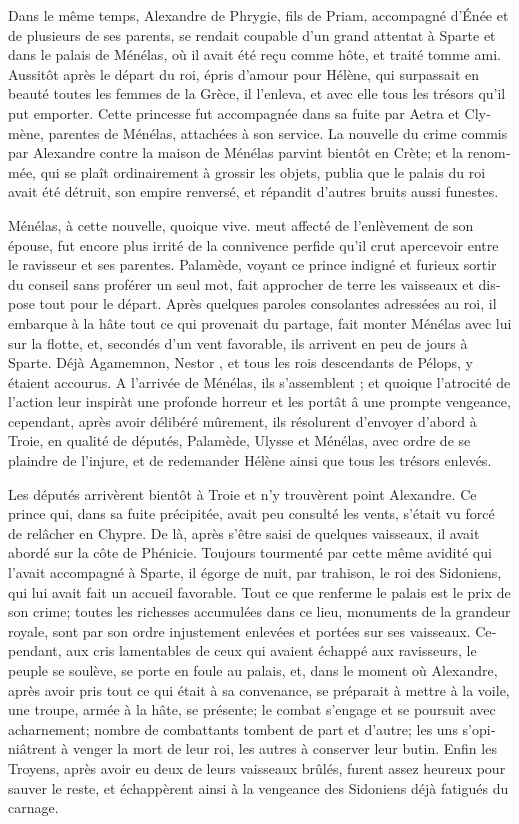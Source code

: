 \documentclass{article}
\begin{document}
\begin{pages}
\begin{Leftside}
\begin{french}
Dans le même temps, Alexandre de Phrygie, fils de Priam, accompagné d'Énée  et de plusieurs de ses parents, se rendait coupable d'un grand attentat à Sparte et dans le palais de Ménélas, où il avait été reçu comme hôte, et traité tomme ami. Aussitôt après le départ du roi, épris d'amour pour Hélène, qui surpassait en beauté toutes les femmes de la Grèce, il l'enleva, et avec elle tous les trésors qu'il put emporter. Cette princesse fut accompagnée dans sa fuite par Aetra et Clymène, parentes de Ménélas, attachées à son service. La nouvelle du crime commis par Alexandre contre la maison de Ménélas parvint bientôt en Crète; et la renommée, qui se plaît ordinairement à grossir les objets, publia que le palais du roi avait été détruit, son empire renversé, et répandit d'autres bruits aussi funestes.

Ménélas, à cette nouvelle, quoique vive. meut affecté de l'enlèvement de son épouse, fut encore plus irrité de la connivence perfide qu'il crut apercevoir entre le ravisseur et ses parentes. Palamède, voyant ce prince indigné et furieux sortir du conseil sans proférer un seul mot, fait approcher de terre les vaisseaux et dispose tout pour le départ. Après quelques paroles consolantes adressées au roi, il embarque à la hâte tout ce qui provenait du partage, fait monter Ménélas avec lui sur la flotte, et, secondés d'un vent favorable, ils arrivent en peu de jours à Sparte. Déjà Agamemnon, Nestor , et tous les rois descendants de Pélops, y étaient accourus. A l'arrivée de Ménélas, ils s'assemblent ; et quoique l'atrocité de l'action leur inspiràt une profonde horreur et les portât â une prompte vengeance, cependant, après avoir délibéré mûrement, ils résolurent d'envoyer d'abord à Troie, en qualité de députés, Palamède, Ulysse et Ménélas, avec ordre de se plaindre de l'injure, et de redemander Hélène ainsi que tous les trésors enlevés.

Les députés arrivèrent bientôt à Troie et n'y trouvèrent point Alexandre. Ce prince qui, dans sa fuite précipitée, avait peu consulté les vents, s'était vu forcé de relâcher en Chypre. De là, après s'être saisi de quelques vaisseaux, il avait abordé sur la côte de Phénicie. Toujours tourmenté par cette même avidité qui l'avait accompagné à Sparte, il égorge de nuit, par trahison, le roi des Sidoniens, qui lui avait fait un accueil favorable. Tout ce que renferme le palais est le prix de son crime; toutes les richesses accumulées dans ce lieu, monuments de la grandeur royale, sont par son ordre injustement enlevées et portées sur ses vaisseaux. Cependant, aux cris lamentables de ceux qui avaient échappé aux ravisseurs, le peuple se soulève, se porte en foule au palais, et, dans le moment où Alexandre, après avoir pris tout ce qui était à sa convenance, se préparait à mettre à la voile, une troupe, armée à la hâte, se présente; le combat s'engage et se poursuit avec acharnement; nombre de combattants tombent de part et d'autre; les uns s'opiniâtrent à venger la mort de leur roi, les autres à conserver leur butin. Enfin les Troyens, après avoir eu deux de leurs vaisseaux brûlés, furent assez heureux pour sauver le reste, et échappèrent ainsi à la vengeance des Sidoniens déjà fatigués du carnage.


\end{french}
\end{Leftside}
\end{pages}
\end{document}
